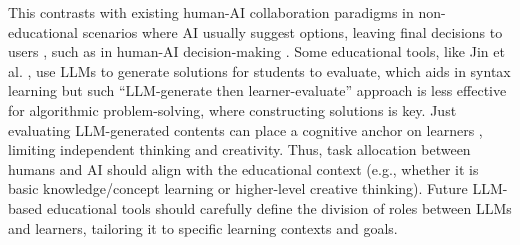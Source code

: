 This contrasts with existing human-AI collaboration paradigms in non-educational scenarios where AI usually suggest options, leaving final decisions to users \cite{dang2023choice, gao2024collabcoder, gebreegziabher2023patat, ma2019smarteye, ma2022glancee}, such as in human-AI decision-making \cite{ma2023should, ma2024towards, ma2024you}. Some educational tools, like Jin et al. \cite{jin2024teach}, use LLMs to generate solutions for students to evaluate, which aids in syntax learning but such ``LLM-generate then learner-evaluate'' approach is less effective for algorithmic problem-solving, where constructing solutions is key. Just evaluating LLM-generated contents can place a cognitive anchor on learners \cite{furnham2011literature}, limiting independent thinking and creativity. Thus, task allocation between humans and AI should align with the educational context (e.g., whether it is basic knowledge/concept learning or higher-level creative thinking). Future LLM-based educational tools should carefully define the division of roles between LLMs and learners, tailoring it to specific learning contexts and goals.







